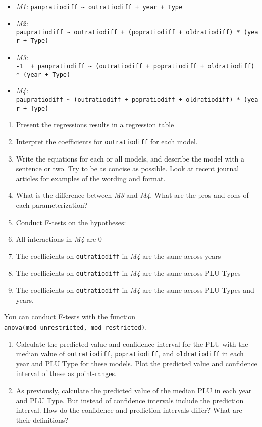 \documentclass[]{article}
\providecommand{\tightlist}{%
  \setlength{\itemsep}{0pt}\setlength{\parskip}{0pt}}
\begin{document}
\begin{itemize}
\tightlist
\item
  \emph{M1:}
  \texttt{paupratiodiff\ \textasciitilde{}\ outratiodiff\ +\ year\ +\ Type}
\item
  \emph{M2:}
  \texttt{paupratiodiff\ \textasciitilde{}\ outratiodiff\ +\ (popratiodiff\ +\ oldratiodiff)\ *\ (year\ +\ Type)}
\item
  \emph{M3:}
  \texttt{-1\ \ +\ paupratiodiff\ \textasciitilde{}\ (outratiodiff\ +\ popratiodiff\ +\ oldratiodiff)\ *\ (year\ +\ Type)}
\item
  \emph{M4:}
  \texttt{paupratiodiff\ \textasciitilde{}\ (outratiodiff\ +\ popratiodiff\ +\ oldratiodiff)\ *\ (year\ +\ Type)}
\end{itemize}

\begin{enumerate}
\def\labelenumi{\arabic{enumi}.}
\item
  Present the regressions results in a regression table
\item
  Interpret the coefficients for \texttt{outratiodiff} for each model.
\item
  Write the equations for each or all models, and describe the model
  with a sentence or two. Try to be as concise as possible. Look at
  recent journal articles for examples of the wording and format.
\item
  What is the difference between \emph{M3} and \emph{M4}. What are the
  pros and cons of each parameterization?
\item
  Conduct F-tests on the hypotheses:
\item
  All interactions in \emph{M4} are 0
\item
  The coefficients on \texttt{outratiodiff} in \emph{M4} are the same
  across years
\item
  The coefficients on \texttt{outratiodiff} in \emph{M4} are the same
  across PLU Types
\item
  The coefficients on \texttt{outratiodiff} in \emph{M4} are the same
  across PLU Types and years.
\end{enumerate}

You can conduct F-tests with the function
\texttt{anova(mod\_unrestricted,\ mod\_restricted)}.

\begin{enumerate}
\def\labelenumi{\arabic{enumi}.}
\setcounter{enumi}{4}
\tightlist
\item
  Calculate the predicted value and confidence interval for the PLU with
  the median value of \texttt{outratiodiff}, \texttt{popratiodiff}, and
  \texttt{oldratiodiff} in each year and PLU Type for these models. Plot
  the predicted value and confidence interval of these as point-ranges.
\item
  As previously, calculate the predicted value of the median PLU in each
  year and PLU Type. But instead of confidence intervals include the
  prediction interval. How do the confidence and prediction intervals
  differ? What are their definitions?
\end{enumerate}
\end{document}
